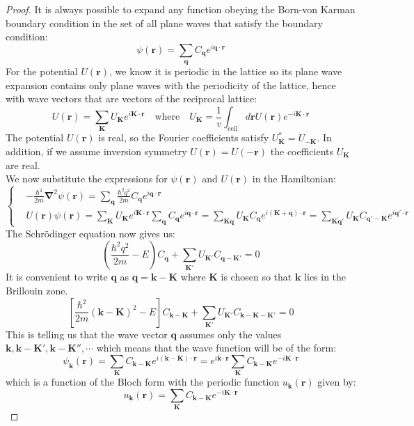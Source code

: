 \documentclass[10.75pt,a4paper,openright,bottom=2cm]{article}
\renewcommand{\Vec}[1]{\boldsymbol{#1}}
\begin{document}
\begin{proof}
It is always possible to expand any function obeying the Born-von Karman boundary condition in the set of all plane waves that satisfy the boundary condition:
\[
\psi(\Vec{r})=\sum_{\Vec{q}}C_{\Vec{q}}e^{i\Vec{q}\cdot\Vec{r}}
\]
For the potential $U(\Vec{r})$, we know it is periodic in the lattice so its plane wave expansion contains only plane waves with the periodicity of the lattice, hence with wave vectors that are vectors of the reciprocal lattice:
\[
U(\Vec{r})=\sum_{\Vec{K}}U_{\Vec{K}}e^{i\Vec{K}\cdot\Vec{r}} \quad \text{where} \quad U_{\Vec{K}}=\frac{1}{v}\int_{\text{cell}}d\Vec{r}U(\Vec{r})e^{-i\Vec{K}\cdot\Vec{r}}
\]
The potential $U(\Vec{r})$ is real, so the Fourier coefficients satisfy $U_{\Vec{K}}^*=U_{-\Vec{K}}$. In addition, if we assume inversion symmetry $U(\Vec{r})=U(-\Vec{r})$ the coefficients $U_{\Vec{K}}$ are real.\\
We now substitute the expressions for $\psi(\Vec{r})$ and $U(\Vec{r})$ in the Hamiltonian:
\[
\left\{
\begin{aligned}
&-\frac{\hbar^2}{2m}\Vec{\nabla}^2\psi(\Vec{r})=\sum_{\Vec{q}}\frac{\hbar^2q^2}{2m}C_{\Vec{q}}e^{i\Vec{q}\cdot\Vec{r}}\\
&U(\Vec{r})\psi(\Vec{r})=\sum_{\Vec{K}}U_{\Vec{K}}e^{i\Vec{K}\cdot\Vec{r}}\sum_{\Vec{q}}C_{\Vec{q}}e^{i\Vec{q}\cdot\Vec{r}}=\sum_{\Vec{K}\Vec{q}}U_{\Vec{K}}C_{\Vec{q}}e^{i(\Vec{K}+\Vec{q})\cdot\Vec{r}}=\sum_{\Vec{K}\Vec{q'}}U_{\Vec{K}}C_{\Vec{q'}-\Vec{K}}e^{i\Vec{q'}\cdot\Vec{r}}
\end{aligned}
\right.
\]
The Schr\"odinger equation now gives us:
\[
\left(\frac{\hbar^2q^2}{2m}-E\right)C_{\Vec{q}}+\sum_{\Vec{K'}}U_{\Vec{K'}}C_{\Vec{q}-\Vec{K'}}=0
\]
It is convenient to write $\Vec{q}$ as $\Vec{q}=\Vec{k}-\Vec{K}$ where $\Vec{K}$ is chosen so that $\Vec{k}$ lies in the  Brillouin zone.
\begin{equation}
\label{central}
\left[\frac{\hbar^2}{2m}(\Vec{k}-\Vec{K})^2-E\right]C_{\Vec{k}-\Vec{K}}+\sum_{\Vec{K'}}U_{\Vec{K'}}C_{\Vec{k}-\Vec{K}-\Vec{K'}}=0
\end{equation}
This is telling us that the wave vector $\Vec{q}$ assumes only the values $\Vec{k},\Vec{k}-\Vec{K'}, \Vec{k}-\Vec{K''},\cdots$ which means that the wave function will be of the form:
\[
\psi_{\Vec{k}}(\Vec{r})=\sum_{\Vec{K}}C_{\Vec{k}-\Vec{K}}e^{i(\Vec{k}-\Vec{K})\cdot\Vec{r}}=e^{i\Vec{k}\cdot\Vec{r}}\sum_{\Vec{K}}C_{\Vec{k}-\Vec{K}}e^{-i\Vec{K}\cdot\Vec{r}}
\]
which is a function of the Bloch form with the periodic function $u_{\Vec{k}}(\Vec{r})$ given by:
\[
u_{\Vec{k}}(\Vec{r})=\sum_{\Vec{K}}C_{\Vec{k}-\Vec{K}}e^{-i\Vec{K}\cdot\Vec{r}}
\]
\end{proof}
\end{document}
